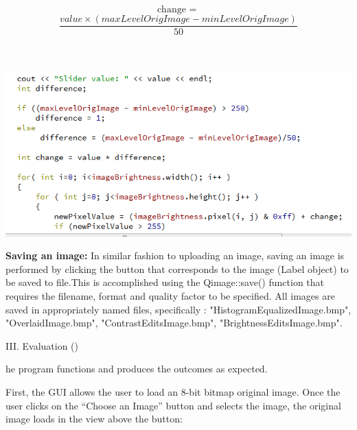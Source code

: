 \documentclass{article}
\newenvironment{Figure}
  {\par\medskip\noindent\ignorespaces\minipage{\linewidth}}
  {\endminipage\par\medskip}
\begin{document}
\begin{multicols*}{2}
\[ \text{change =  } \]
\[  \frac{  value \times (maxLevelOrigImage -minLevelOrigImage) }{50}\]\\\

\begin{Figure}
 \centering
 \includegraphics[width=\linewidth]{brightnessadjustment.png}
\end{Figure}

\vspace{30 pt}
{\bf Saving an image:} 
In similar fashion to uploading an image, saving an image is performed by clicking the button that corresponds to the image (Label object) to be saved to file.This is accomplished using the Qimage::save() function that requires the filename, format and quality factor to be specified. All images are saved in appropriately named files, specifically :  "HistogramEqualizedImage.bmp", "OverlaidImage.bmp", "ContrastEditsImage.bmp", "BrightnessEditsImage.bmp".



\begin{center}
{\large III. Evaluation ()}\\
\end{center}

he program functions and produces the outcomes as expected.

First, the GUI allows the user to load an 8-bit bitmap original image. Once the user clicks on the “Choose an Image” button and selects the image, the original image loads in the view above the button:


\end{multicols*}
\end{document}
